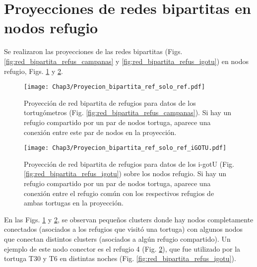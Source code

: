 \section{Proyecciones de redes bipartitas en nodos refugio}
Se realizaron las proyecciones de las redes bipartitas (Figs. \ref{fig:red_bipartita_refus_campanas} y \ref{fig:red_bipartita_refus_igotu}) en nodos refugio, Figs. \ref{fig:proyeccion_red_campanas_refus} y \ref{fig:proyeccion_red_igotu_refus}.
 
 
\begin{figure}[ht]
    \begin{center}
        \texttt{[image: Chap3/Proyecion\_bipartita\_ref\_solo\_ref.pdf]}
        \caption[Proyección  de red bipartita de refugios para datos de los tortugómetros en nodos refugio.]{Proyección  de red bipartita de refugios para datos de los tortugómetros (Fig. \ref{fig:red_bipartita_refus_campanas}). Si hay un refugio compartido por un par de nodos tortuga, aparece una conexión entre este par de nodos en la proyección. }
        \label{fig:proyeccion_red_campanas_refus}
       
        \end{center}
\end{figure}
 
\begin{figure}[ht]
    \begin{center}
        \texttt{[image: Chap3/Proyecion\_bipartita\_ref\_solo\_ref\_iGOTU.pdf]}
        \caption[Proyección  de red bipartita de refugios para datos de los i-gotU en nodos refugio.]{Proyección  de red bipartita de refugios para datos de los i-gotU (Fig. \ref{fig:red_bipartita_refus_igotu}) sobre los nodos refugio. Si hay un refugio compartido por un par de nodos tortuga, aparece una conexión entre el refugio común con los respectivos refugios de ambas tortugas en la proyección. }
        \label{fig:proyeccion_red_igotu_refus}
       
        \end{center}
\end{figure}
En las Figs. \ref{fig:proyeccion_red_campanas_refus} y \ref{fig:proyeccion_red_igotu_refus}, se observan pequeños clusters donde hay nodos completamente conectados (asociados a los refugios que visitó una tortuga) con algunos nodos que conectan distintos clusters (asociados a algún refugio compartido). Un ejemplo de este nodo conector es el refugio 4 (Fig. \ref{fig:proyeccion_red_igotu_refus}), que fue utilizado por la tortuga T30 y T6 en distintas noches (Fig. \ref{fig:red_bipartita_refus_igotu}).
 
